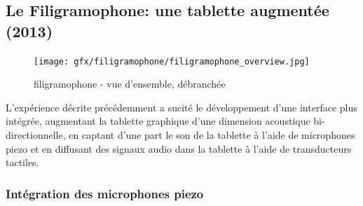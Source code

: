 \subsection{Le Filigramophone: une tablette augmentée (2013)}
\label{sec:interfaces:phylogenese:filigramophone}

\begin{figure}[!htbp]
	\texttt{[image: gfx/filigramophone/filigramophone\_overview.jpg]}
	\caption{filigramophone - vue d'ensemble, débranchée}
	\label{fig:interface:filigramophone}
\end{figure}
\noindent L'expérience décrite précédemment a sucité le développement d'une interface plus intégrée, augmentant la tablette graphique d'une dimension acoustique bi-directionnelle, en captant d'une part le son de la tablette à l'aide de microphones piezo et en diffusant des signaux audio dans la tablette à l'aide de transducteurs tactiles.

\subsubsection{Intégration des microphones piezo}

